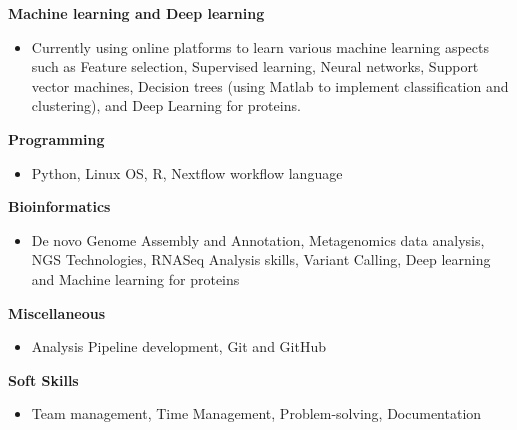 
\begin{cventries}
  \cventry
  {\textbf{Machine learning and Deep learning}} %
  {} %
  {} %
  {} %
  {
    \begin{itemize}
      \item Currently using online platforms to learn various machine learning aspects such as Feature selection, Supervised learning, Neural networks, Support vector machines, Decision trees (using Matlab to implement classification and clustering), and Deep Learning for proteins.
    \end{itemize}
  }

  \cventry
  {\textbf{Programming}} %
  {} %
  {} %
  {} %
  {
    \begin{itemize}
      \item Python, Linux OS, R, Nextflow workflow language
    \end{itemize}
  }

\cventry
{\textbf{Bioinformatics}} %
{} %
{} %
{} %
{ 
\begin{itemize}
    \item {De novo Genome Assembly and Annotation, Metagenomics data analysis, NGS Technologies, RNASeq Analysis skills, Variant Calling, Deep learning and Machine learning for proteins}
\end{itemize}
}

\cventry
{\textbf{Miscellaneous}} %
{} %
{} %
{} %
{ 
\begin{itemize}
    \item{Analysis Pipeline development, Git and GitHub}
\end{itemize}
}
\cventry
{\textbf{Soft Skills}} %
{} %
{} %
{} %
{ 
\begin{itemize}
    \item {Team management, Time Management, Problem-solving, Documentation}
\end{itemize}
}

\end{cventries}
